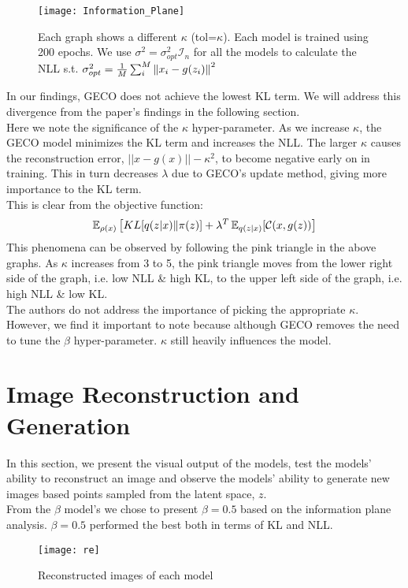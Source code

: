 \begin{figure}[H]
\hspace*{-2.5cm}
\texttt{[image: Information\_Plane]}
\caption{Each graph shows a different $\kappa$ (tol=$\kappa$). Each model is trained using 200 epochs. We use $\sigma^2=\sigma_{opt}^2\mathcal{I}_n$ for all the models to calculate the NLL s.t. $\sigma_{opt}^2 = \frac{1}{M}\sum_{i}^M \left\lVert x_i - g(z_i)\right\rVert^2$}
\centering
\end{figure}
In our findings, GECO does not achieve the lowest KL term. We will address this divergence from the paper's findings in the following section.\\
Here we note the significance of the $\kappa$ hyper-parameter. As we increase $\kappa$, the GECO model minimizes the KL term and increases the NLL. The larger $\kappa$ causes the reconstruction error, $||x-g(x)||-\kappa^2$, to become negative early on in training. This in turn decreases $\lambda$ due to GECO's update method, giving more importance to the KL term.\\
This is clear from the objective function:
\begin{gather*}
\operatorname{\mathbb{E}}_{\rho(x)}\left[KL[q(z|x) \| \pi(z)] + \lambda^{T}\operatorname{\mathbb{E}}_{q(z|x)}[\mathcal{C}(x, g(z))\right]
\end{gather*}
This phenomena can be observed by following the pink triangle in the above graphs. As $\kappa$ increases from 3 to 5, the pink triangle moves from the lower right side of the graph, i.e. low NLL \& high KL, to the upper left side of the graph, i.e. high NLL \& low KL.\\
The authors do not address the importance of picking the appropriate $\kappa$. However, we find it important to note because although GECO removes the need to tune the $\beta$ hyper-parameter. $\kappa$ still heavily influences the model.

\section*{Image Reconstruction and Generation}
In this section, we present the visual output of the models, test the models' ability to reconstruct an image and observe the models' ability to generate new images based points sampled from the latent space, $z$.\\
From the $\beta$ model's we chose to present $\beta = 0.5$ based on the information plane analysis. $\beta = 0.5$ performed the best both in terms of KL and NLL. 
\begin{figure}[H]
\texttt{[image: re]}
\caption{Reconstructed images of each model}
\centering
\end{figure}

